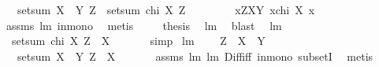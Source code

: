 \begin{isabellebody}
\ \ \ {\isachardoublequoteopen}setsum\ {\isacharparenleft}X\ {\isacharless}{\isacharbar}\ Y{\isacharparenright}\ Z\ {\isacharequal}\ setsum\ {\isacharparenleft}chi\ X{\isacharparenright}\ Z{\isachardoublequoteclose}\ \ \isanewline
%
\isadelimproof
%
\endisadelimproof
%
\isatagproof
{}\isamarkupfalse%
\ {\isacharminus}\ \isanewline
\ \ \isamarkupfalse%
\ {\isachardoublequoteopen}{\isacharbang}x{\isacharcolon}Z{\isachardot}{\isacharparenleft}X{\isacharless}{\isacharbar}Y{\isacharparenright}\ x{\isacharequal}{\isacharparenleft}chi\ X{\isacharparenright}\ x{\isachardoublequoteclose}\ \isamarkupfalse%
\ assms\ lm{}{}{}\ in{\isacharunderscore}mono\ \isamarkupfalse%
\ metis\ \isanewline
\ \ \isamarkupfalse%
\ {\isacharquery}thesis\ \isamarkupfalse%
\ lm{}{}{}\ \isamarkupfalse%
\ blast\ \isanewline
{}\isamarkupfalse%
%
\endisatagproof
{\isafoldproof}%
%
\isadelimproof
\isanewline
%
\endisadelimproof
\isanewline
{}\isamarkupfalse%
\ lm{}{}{}{\isacharcolon}\ \isanewline
\ \ {\isachardoublequoteopen}setsum\ {\isacharparenleft}chi\ X{\isacharparenright}\ {\isacharparenleft}Z\ {\isacharminus}\ X{\isacharparenright}\ {\isacharequal}\ {}{\isachardoublequoteclose}\ \isanewline
%
\isadelimproof
\ \ %
\endisadelimproof
%
\isatagproof
{}\isamarkupfalse%
\ simp%
\endisatagproof
{\isafoldproof}%
%
\isadelimproof
\isanewline
%
\endisadelimproof
\isanewline
{}\isamarkupfalse%
\ lm{}{}{}{\isacharcolon}\ \isanewline
\ \ \ {\isachardoublequoteopen}Z\ {\isasymsubseteq}\ X\ {\isasymunion}\ Y{\isachardoublequoteclose}\ \isanewline
\ \ \ {\isachardoublequoteopen}setsum\ {\isacharparenleft}X\ {\isacharless}{\isacharbar}\ Y{\isacharparenright}\ {\isacharparenleft}Z\ {\isacharminus}\ X{\isacharparenright}\ {\isacharequal}\ {}{\isachardoublequoteclose}\ \isanewline
%
\isadelimproof
\ \ %
\endisadelimproof
%
\isatagproof
{}\isamarkupfalse%
\ assms\ lm{}{}{}\ lm{}{}{}\ Diff{\isacharunderscore}iff\ in{\isacharunderscore}mono\ subsetI\ \isamarkupfalse%
\ metis%
\endisatagproof
{\isafoldproof}%
%
\isadelimproof
\isanewline
%
\endisadelimproof
\isanewline
{}\isamarkupfalse%

\end{isabellebody}
